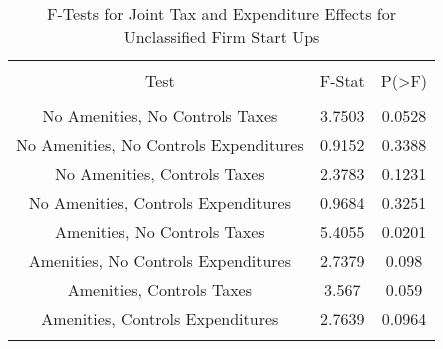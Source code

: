 
\begin{table}[!htbp] \centering 
  \caption{F-Tests for Joint Tax and Expenditure Effects for Unclassified Firm Start Ups} 
  \label{99Ftests} 
\begin{tabular}{@{\extracolsep{5pt}} ccc} 
\\[-1.8ex]\hline 
\hline \\[-1.8ex] 
Test & F-Stat & P(\textgreater F) \\ 
\hline \\[-1.8ex] 
No Amenities, No Controls Taxes & 3.7503 & 0.0528 \\ 
No Amenities, No Controls Expenditures & 0.9152 & 0.3388 \\ 
No Amenities, Controls Taxes & 2.3783 & 0.1231 \\ 
No Amenities, Controls Expenditures & 0.9684 & 0.3251 \\ 
Amenities, No Controls Taxes & 5.4055 & 0.0201 \\ 
Amenities, No Controls Expenditures & 2.7379 & 0.098 \\ 
Amenities, Controls Taxes & 3.567 & 0.059 \\ 
Amenities, Controls Expenditures & 2.7639 & 0.0964 \\ 
\hline \\[-1.8ex] 
\end{tabular} 
\end{table} 
